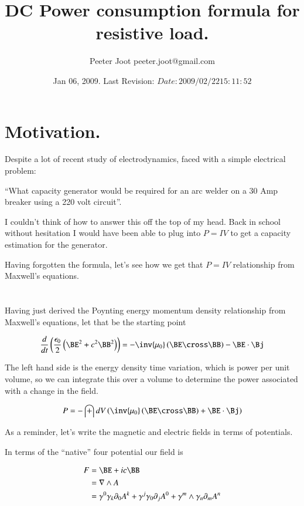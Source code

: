 \documentclass{article}
\title{ DC Power consumption formula for resistive load. }
\author{Peeter Joot \quad peeter.joot@gmail.com}
\date{ Jan 06, 2009.  Last Revision: $Date: 2009/02/22 15:11:52 $ }
\begin{document}
\maketitle{}

\section{ Motivation. }

Despite a lot of recent study of electrodynamics, faced with a simple electrical problem:

``What capacity generator would be required for an arc welder on a 30 Amp breaker using a 220 volt circuit''.

I couldn't think of how to answer this off the top of my head.  Back in school without hesitation I would have
been able to plug into $P = I V$ to get a capacity estimation for the generator.

Having forgotten the formula, let's see how we get that $P = I V$ relationship from Maxwell's equations.

\section{}

Having just derived the Poynting energy momentum density relationship from Maxwell's equations, let that be the starting
point

\begin{align*}
\frac{d}{dt}\left(\frac{\epsilon_0}{2}\left(\BE^2 + c^2\BB^2 \right) \right) = - \inv{\mu_0} \left(\BE \cross \BB \right) - \BE \cdot \Bj
\end{align*}

The left hand side is the energy density time variation, which is power per unit volume, so we can integrate this
over a volume to determine the power associated with a change in the field.

\begin{align*}
P = -\int dV \left( \inv{\mu_0} \left(\BE \cross \BB \right) + \BE \cdot \Bj \right)
\end{align*}

As a reminder, let's write the magnetic and electric fields in terms of potentials.

In terms of the ``native'' four potential our field is

\begin{align*}
F 
&= \BE + ic \BB \\
&= \grad \wedge A \\
&= \gamma^0 \gamma_k \partial_0 A^k + \gamma^j \gamma_0 \partial_j A^0 + \gamma^m \wedge \gamma_n \partial_m A^n \\
\end{align*}
\end{document}

